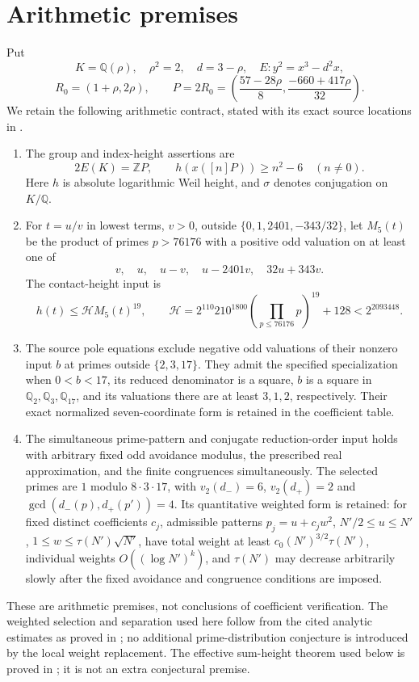 \documentclass[11pt,a4paper]{article}
\theoremstyle{remark}\newtheorem{remark}[theorem]{Remark}
\newcommand{\Q}{\mathbb Q}\newcommand{\Z}{\mathbb Z}\newcommand{\HH}{\mathcal H}
\begin{document}
\section{Arithmetic premises}\label{sec:premises}
Put
\[
 K=\Q(\rho),\quad\rho^2=2,\quad d=3-\rho,\quad
 E:y^2=x^3-d^2x,
\]
\[
 R_0=(1+\rho,2\rho),\qquad
 P=2R_0=\left(\frac{57-28\rho}{8},\frac{-660+417\rho}{32}\right).
\]
We retain the following arithmetic contract, stated with its exact
source locations in \cite[Section~2]{Source}.
\begin{enumerate}
\item The group and index-height assertions are
\[
 2E(K)=\Z P,\qquad h(x([n]P))\ge n^2-6\quad(n\ne0).
\]
Here $h$ is absolute logarithmic Weil height, and $\sigma$ denotes
conjugation on $K/\Q$.
\item For $t=u/v$ in lowest terms, $v>0$, outside
$\{0,1,2401,-343/32\}$, let $M_5(t)$ be the product of primes
$p>76176$ with a positive odd valuation on at least one of
\[
             v,\quad u,\quad u-v,\quad u-2401v,\quad32u+343v.
\]
The contact-height input is
\[
 h(t)\le\HH M_5(t)^{19},\qquad
 \HH=2^{110}210^{1800}\left(\prod_{p\le76176}p\right)^{19}+128
       <2^{2093448}.
\]
\item The source pole equations exclude negative odd valuations of their
nonzero input $b$ at primes outside $\{2,3,17\}$. They admit the specified
specialization when $0<b<17$, its reduced denominator is a square,
$b$ is a square in $\Q_2,\Q_3,\Q_{17}$, and its valuations there are
at least $3,1,2$, respectively. Their exact normalized seven-coordinate
form is retained in the coefficient table.
\item The simultaneous prime-pattern and conjugate reduction-order input
holds with arbitrary fixed odd avoidance modulus, the prescribed real
approximation, and the finite congruences simultaneously. The selected
primes are $1$ modulo $8\cdot3\cdot17$, with
$v_2(d_-)=6$, $v_2(d_+)=2$ and
$\gcd(d_-(p),d_+(p'))=4$. Its quantitative weighted form is retained:
for fixed distinct coefficients $c_j$, admissible patterns
$p_j=u+c_jw^2$, $N'/2\le u\le N'$,
$1\le w\le\tau(N')\sqrt{N'}$, have total weight at least
$c_0(N')^{3/2}\tau(N')$, individual weights
$O((\log N')^k)$, and $\tau(N')$ may decrease arbitrarily slowly
after the fixed avoidance and congruence conditions are imposed.
\end{enumerate}
These are arithmetic premises, not conclusions of coefficient
verification. The weighted selection and
separation used here follow from the cited analytic estimates as proved
in \cite{Selection}; no additional prime-distribution conjecture is
introduced by the local weight replacement. The effective sum-height theorem used below is proved
in \cite{Sums}; it is not an extra conjectural premise.
\end{document}
